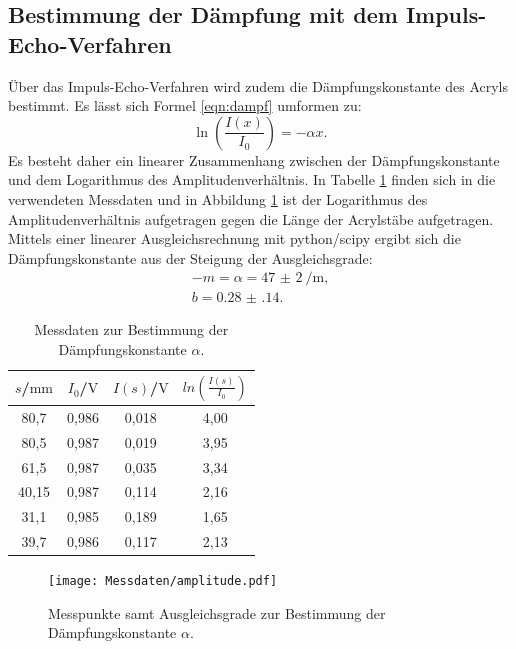 \subsection{Bestimmung der Dämpfung mit dem Impuls-Echo-Verfahren}
Über das Impuls-Echo-Verfahren wird zudem die Dämpfungskonstante des Acryls bestimmt.
Es lässt sich Formel \eqref{eqn:dampf} umformen zu:
\begin{equation}
  \ln{\left( \frac{I(x)}{I_0}\right)}=-\alpha x \text{.}
\end{equation}
Es besteht daher ein linearer Zusammenhang zwischen der Dämpfungskonstante und dem Logarithmus des Amplitudenverhältnis.
In Tabelle \ref{tab:daempf} finden sich in die verwendeten Messdaten und in Abbildung \ref{fig:daempf} ist der Logarithmus des Amplitudenverhältnis aufgetragen gegen die Länge der Acrylstäbe aufgetragen.
Mittels einer linearer Ausgleichsrechnung mit python/scipy \cite{scipy} ergibt sich die Dämpfungskonstante aus der Steigung der Ausgleichsgrade:
\begin{gather*}
-m=\alpha=\SI{47(2)}{\per\meter} \text{,}\\
b=  \num{0.28(14)}\text{.}
\end{gather*}


\begin{table}
\centering
\caption{Messdaten zur Bestimmung der Dämpfungskonstante $\alpha$.}
\label{tab:daempf}
\begin{tabular}{cccc}
  \toprule
	$s$/$\si{\milli\meter}$ & $I_0$/$\si{\volt}$ & $I(s)$/$\si{\volt}$ & $ln\left(\frac{I(s)}{I_0}\right)$ \\
\midrule
80,7 & 0,986 & 0,018 & 4,00 \\
80,5 & 0,987 & 0,019 & 3,95 \\
61,5 & 0,987 & 0,035 & 3,34 \\
40,15 & 0,987 & 0,114 & 2,16 \\
31,1 & 0,985 & 0,189 & 1,65 \\
39,7 & 0,986 & 0,117 & 2,13 \\
\bottomrule
\end{tabular}
\end{table}

\begin{figure}
  \centering
  \texttt{[image: Messdaten/amplitude.pdf]}
  \caption{Messpunkte samt Ausgleichsgrade zur Bestimmung der Dämpfungskonstante $\alpha$.}
  \label{fig:daempf}
\end{figure}
\FloatBarrier

